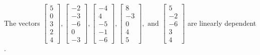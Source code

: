 \begin{exercise}
\begin{exerciseStatement}
  \end{exerciseStatement}
  \begin{exerciseAnswer}
   The vectors \(\left[\begin{array}{r}
5 \\
0 \\
3 \\
2 \\
4
\end{array}\right] , \left[\begin{array}{r}
-2 \\
-3 \\
-6 \\
0 \\
-3
\end{array}\right] , \left[\begin{array}{r}
-4 \\
4 \\
-5 \\
-1 \\
-6
\end{array}\right] , \left[\begin{array}{r}
8 \\
-3 \\
0 \\
4 \\
5
\end{array}\right] , \text{ and } \left[\begin{array}{r}
5 \\
-2 \\
-6 \\
3 \\
4
\end{array}\right]\) are 
  	 linearly dependent  .
  


  \end{exerciseAnswer}
\end{exercise}